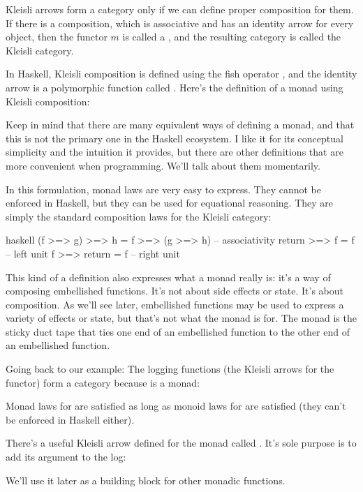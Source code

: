 Kleisli arrows form a category only if we can define proper composition
for them. If there is a composition, which is associative and has an
identity arrow for every object, then the functor $m$ is called a
, and the resulting category is called the Kleisli category.

In Haskell, Kleisli composition is defined using the fish operator
\code{>=>}, and the identity arrow is a
polymorphic function called . Here's the definition of a
monad using Kleisli composition:

Keep in mind that there are many equivalent ways of defining a monad,
and that this is not the primary one in the Haskell ecosystem. I like it
for its conceptual simplicity and the intuition it provides, but there
are other definitions that are more convenient when programming. We'll
talk about them momentarily.

In this formulation, monad laws are very easy to express. They cannot be
enforced in Haskell, but they can be used for equational reasoning. They
are simply the standard composition laws for the Kleisli category:

\begin{snip}{haskell}
(f >=> g) >=> h = f >=> (g >=> h) -- associativity
return >=> f = f                  -- left unit
f >=> return = f                  -- right unit
\end{snip}
This kind of a definition also expresses what a monad really is: it's a
way of composing embellished functions. It's not about side effects or
state. It's about composition. As we'll see later, embellished functions
may be used to express a variety of effects or state, but that's not
what the monad is for. The monad is the sticky duct tape that ties one
end of an embellished function to the other end of an embellished
function.

Going back to our  example: The logging functions (the
Kleisli arrows for the  functor) form a category because
 is a monad:

Monad laws for  are satisfied as long as monoid laws
for  are satisfied (they can't be enforced in Haskell either).

There's a useful Kleisli arrow defined for the  monad
called . It's sole purpose is to add its argument to the
log:

We'll use it later as a building block for other monadic functions.

